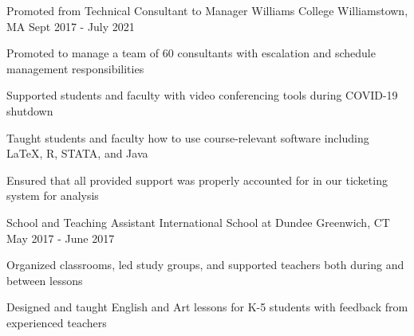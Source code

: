 \begin{cventries}
  \cventry
  {Promoted from Technical Consultant to Manager}
  {Williams College}
  {Williamstown, MA}
  {Sept 2017 - July 2021}
  {
    \begin{cvitems}
      \item {Promoted to manage a team of 60 consultants with escalation and schedule management responsibilities}
      \item {Supported students and faculty with video conferencing tools during COVID-19 shutdown}
      \item {Taught students and faculty how to use course-relevant software including LaTeX, R, STATA, and Java}
      \item {Ensured that all provided support was properly accounted for in our ticketing system for analysis}
    \end{cvitems}
  }

  \cventry
  {School and Teaching Assistant}
  {International School at Dundee}
  {Greenwich, CT}
  {May 2017 - June 2017}
  {
    \begin{cvitems}
      \item{Organized classrooms, led study groups, and supported teachers both during and between lessons}
      \item{Designed and taught English and Art lessons for K-5 students with feedback from experienced teachers}
    \end{cvitems}
  }
\end{cventries}
